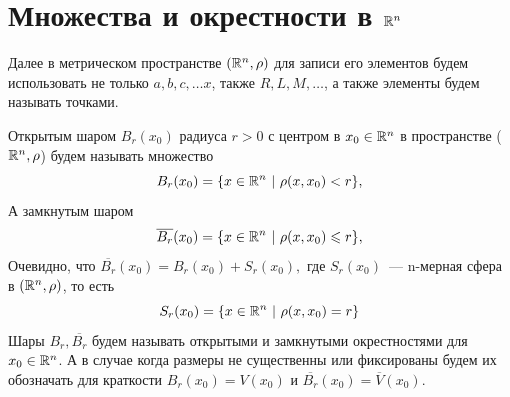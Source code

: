 \documentclass[../../main.tex]{subfiles}
\begin{document}
  
  \section{Множества и окрестности в $\mathbb{R}^n$}
  Далее в метрическом пространстве $(\mathbb{R}^n, \rho)$ для записи его 
  элементов будем использовать не только $a, b, c, \dots x$, также 
  $R, L, M, \dots$, а также элементы будем называть точками.
  
  Открытым шаром $B_r(x_0)$ радиуса $r > 0$ с центром в $x_0 \in 
  \mathbb{R}^n$ в пространстве ($\mathbb{R}^n, \rho$) будем называть множество 
  \[
  B_r(x_0) = \{x \in \mathbb{R}^n\ |\ \rho(x, x_0) < r\}, 
  \]
  А замкнутым шаром
  \[
  \overline{B_r}(x_0) = \{x \in \mathbb{R}^n\ |\ \rho(x, x_0) \leqslant r\}, 
  \] 
  Очевидно, что $\overline{B_r}(x_0) = B_r(x_0) + S_r(x_0),$ где $ 
  S_r(x_0)$~--- n-мерная сфера в  $(\mathbb{R}^n, \rho)$, то есть 
  \[
  S_r(x_0) = \{x \in \mathbb{R}^n\ |\ \rho(x, x_0) = r\}
  \] 
  Шары $B_r, \overline{B_r}$ будем называть открытыми и замкнутыми 
  окрестностями для $x_0 \in \mathbb{R}^n$. А в случае когда размеры не 
  существенны или фиксированы будем их обозначать для краткости 
  $B_r(x_0) = V(x_0)$ и $\overline{B_r}(x_0) = \overline{V}(x_0)$.
  
\end{document}
